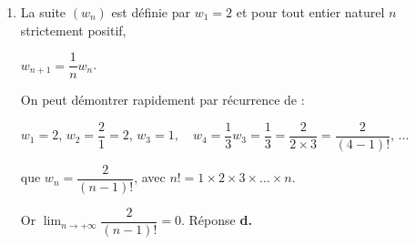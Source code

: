 \begin{enumerate}
\item  La suite $\left(w_n\right)$ est définie par $w_1 = 2$ et pour tout entier naturel $n$ strictement positif, 

$w_{n+1} = \dfrac1n w_n$.






On peut démontrer rapidement par récurrence de :

$w_1 = 2$, \quad $w_2 = \dfrac{2}{1} = 2$, \quad $w_3 = 1, \quad w_4 = \dfrac{1}{3}w_3 = \dfrac13 = \dfrac{2}{2 \times 3} = \dfrac{2}{(4 - 1)!}$, ...

que $w_n = \dfrac{2}{(n-1)!}$, avec $n! = 1 \times 2 \times 3 \times \ldots \times n$.

Or $\displaystyle\lim_{n \to + \infty}\dfrac{2}{(n- 1)!} = 0$. Réponse \textbf{d.}
\end{enumerate}

\bigskip
